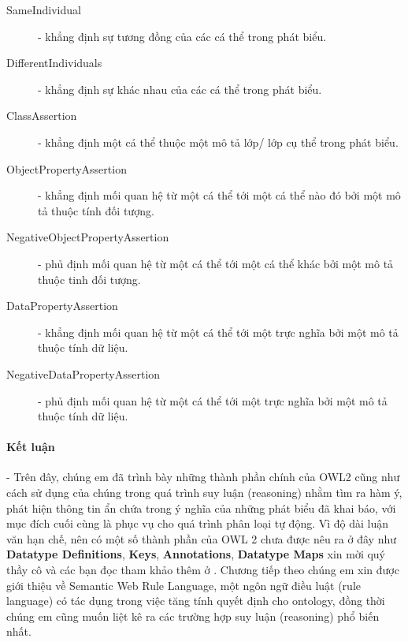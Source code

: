 \begin{description}
\item[SameIndividual] - khẳng định sự tương đồng của các cá thể trong phát biểu.

\item[DifferentIndividuals] - khẳng định sự khác nhau của các cá thể trong phát biểu.

\item[ClassAssertion] - khẳng định một cá thể thuộc một mô tả lớp/ lớp cụ thể trong phát biểu.

\item[ObjectPropertyAssertion] - khẳng định mối quan hệ từ một cá thể tới một cá thể nào đó bởi một mô tả thuộc tính đối tượng.

\item[NegativeObjectPropertyAssertion] - phủ định mối quan hệ từ một cá thể tới một cá thể khác bởi một mô tả thuộc tinh đối tượng.

\item[DataPropertyAssertion] - khẳng định mối quan hệ từ một cá thể tới một trực nghĩa bởi một mô tả thuộc tính dữ liệu.

\item[NegativeDataPropertyAssertion] - phủ định mối quan hệ từ một cá thể tới một trực nghĩa bởi một mô tả thuộc tính dữ liệu.
\end{description}

\paragraph{Kết luận} - Trên đây, chúng em đã trình bày những thành phần chính của OWL2 cũng như cách sử dụng của chúng trong quá trình suy luận (reasoning) nhằm tìm ra hàm ý, phát hiện thông tin ẩn chứa trong ý nghĩa của những phát biểu đã khai báo, với mục đích cuối cùng là phục vụ cho quá trình phân loại tự động. Vì độ dài luận văn hạn chế, nên có một số thành phần của OWL 2 chưa được nêu ra ở đây như \textbf{Datatype Definitions}, \textbf{Keys}, \textbf{Annotations}, \textbf{Datatype Maps} xin mời quý thầy cô và các bạn đọc tham khảo thêm ở \cite{owl2spec}. Chương tiếp theo chúng em xin được giới thiệu về Semantic Web Rule Language, một ngôn ngữ điều luật (rule language) có tác dụng trong việc tăng tính quyết định cho ontology, đồng thời chúng em cũng muốn liệt kê ra các trường hợp suy luận (reasoning) phổ biến nhất.